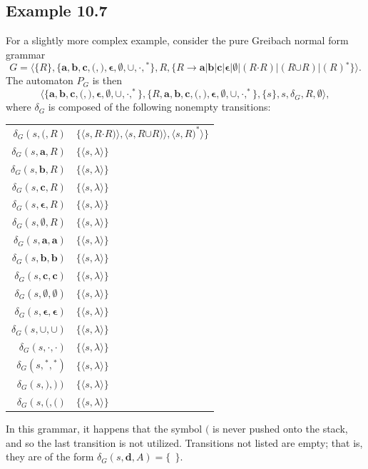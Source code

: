 \subsection*{Example 10.7}

For a slightly more complex example, consider the pure Greibach normal form
grammar
\[ G = \langle\{R\},\{\pmb{a},\pmb{b},\pmb{c},\pmb{(},\pmb{)},\pmb{\epsilon},
	\pmb{\emptyset},\pmb{\cup},\pmb{\cdot},\pmb{^*}\},R,\{R\rightarrow
	\pmb{a}|\pmb{b}|\pmb{c}|\pmb{\epsilon}|\pmb{\emptyset}|(R\pmb{\cdot}R)|
	(R\pmb{\cup}R)|(R)\pmb{^*}\}\rangle. \]
The automaton $P_G$ is then
\[ \langle\{\pmb{a},\pmb{b},\pmb{c},\pmb{(},\pmb{)},\pmb{\epsilon},
	\pmb{\emptyset},\pmb{\cup},\pmb{\cdot},^{\pmb{*}}\},\{R,\pmb{a},\pmb{b},
	\pmb{c},\pmb{(},\pmb{)},\pmb{\epsilon},\pmb{\emptyset},\pmb{\cup},
	\pmb{\cdot},^{\pmb{*}}\},\{s\},s,\delta_G,R,\emptyset\rangle, \]
where $\delta_G$ is composed of the following nonempty transitions:
\begin{center}\begin{tabular}{r@{ = }l}
$\delta_G(s,\pmb{(},R)$ & $\{\langle s,R\pmb{\cdot}R\pmb{)}\rangle,\langle s,R
	\pmb{\cup}R\pmb{)}\rangle,\langle s,R\pmb{)}^{\pmb{*}}\rangle\}$ \\
$\delta_G(s,\pmb{a},R)$ & $\{\langle s,\lambda\rangle\}$ \\
$\delta_G(s,\pmb{b},R)$ & $\{\langle s,\lambda\rangle\}$ \\
$\delta_G(s,\pmb{c},R)$ & $\{\langle s,\lambda\rangle\}$ \\
$\delta_G(s,\pmb{\epsilon},R)$ & $\{\langle s,\lambda\rangle\}$ \\
$\delta_G(s,\pmb{\emptyset},R)$ & $\{\langle s,\lambda\rangle\}$ \\
$\delta_G(s,\pmb{a},\pmb{a})$ & $\{\langle s,\lambda\rangle\}$ \\
$\delta_G(s,\pmb{b},\pmb{b})$ & $\{\langle s,\lambda\rangle\}$ \\
$\delta_G(s,\pmb{c},\pmb{c})$ & $\{\langle s,\lambda\rangle\}$ \\
$\delta_G(s,\pmb{\emptyset},\pmb{\emptyset})$ & $\{\langle s,\lambda\rangle\}$ \\
$\delta_G(s,\pmb{\epsilon},\pmb{\epsilon})$ & $\{\langle s,\lambda\rangle\}$ \\
$\delta_G(s,\pmb{\cup},\pmb{\cup})$ & $\{\langle s,\lambda\rangle\}$ \\
$\delta_G(s,\pmb{\cdot},\pmb{\cdot})$ & $\{\langle s,\lambda\rangle\}$ \\
$\delta_G(s,\pmb{^*},\pmb{^*})$ & $\{\langle s,\lambda\rangle\}$ \\
$\delta_G(s,\pmb{)},\pmb{)})$ & $\{\langle s,\lambda\rangle\}$ \\
$\delta_G(s,\pmb{(},\pmb{(})$ & $\{\langle s,\lambda\rangle\}$ \\
\end{tabular}\end{center}
In this grammar, it happens that the symbol $\pmb{(}$ is never pushed onto the
stack, and so the last transition is not utilized. Transitions not listed are
empty; that is, they are of the form $\delta_G(s,\pmb{d},A)=\{\ \ \}$.

